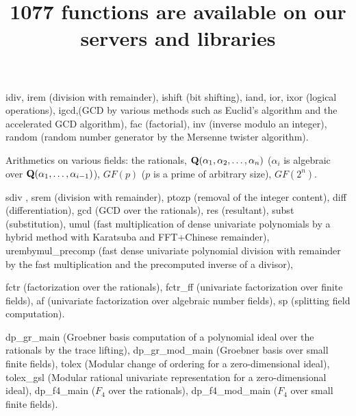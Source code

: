 \documentclass[twocolumn]{article}
\title{\huge \color{blue} 1077 functions are available
on our servers and libraries}
\author{} \date{}
\begin{document}
\maketitle

\noindent
{}

\noindent
{\color{red} idiv},{\color{red} irem} (division with remainder),
{\color{red} ishift} (bit shifting),
{\color{red} iand},{\color{red} ior},{\color{red} ixor} (logical operations),
{\color{red} igcd},(GCD by various methods such as Euclid's algorithm and
the accelerated GCD algorithm),
{\color{red} fac} (factorial),
{\color{red} inv} (inverse modulo an integer),
{\color{red} random} (random number generator by the Mersenne twister algorithm).



\medbreak

\noindent
{}

\noindent
Arithmetics on various fields: the rationals, 
${\bf Q}(\alpha_1,\alpha_2,\ldots,\alpha_n)$
($\alpha_i$ is algebraic over ${\bf Q}(\alpha_1,\ldots,\alpha_{i-1})$),
$GF(p)$ ($p$ is a prime of arbitrary size), $GF(2^n)$.

\medbreak

\noindent
{}

\noindent
{\color{red} sdiv }, {\color{red} srem } (division with remainder),
{\color{red} ptozp } (removal of the integer content),
{\color{red} diff } (differentiation),
{\color{red} gcd } (GCD over the rationals),
{\color{red} res } (resultant),
{\color{red} subst } (substitution),
{\color{red} umul} (fast multiplication of dense univariate polynomials 
by a hybrid method with Karatsuba and FFT+Chinese remainder),
{\color{red} urembymul\_precomp} (fast dense univariate polynomial 
division with remainder by the fast multiplication and 
the precomputed inverse of a divisor),

\noindent
{}
{\color{red} fctr } (factorization over the rationals),
{\color{red} fctr\_ff } (univariate factorization over finite fields),
{\color{red} af } (univariate factorization over algebraic number fields),
{\color{red} sp} (splitting field computation).

\medbreak

\noindent
{} 

\noindent
{\color{red} dp\_gr\_main } (Groebner basis computation of a polynomial ideal 
over the rationals by the trace lifting),
{\color{red} dp\_gr\_mod\_main } (Groebner basis over small finite fields),
{\color{red} tolex } (Modular change of ordering for a zero-dimensional ideal),
{\color{red} tolex\_gsl } (Modular rational univariate representation 
for a zero-dimensional ideal),
{\color{red} dp\_f4\_main } ($F_4$ over the rationals),
{\color{red} dp\_f4\_mod\_main } ($F_4$ over small finite fields).
\end{document}
